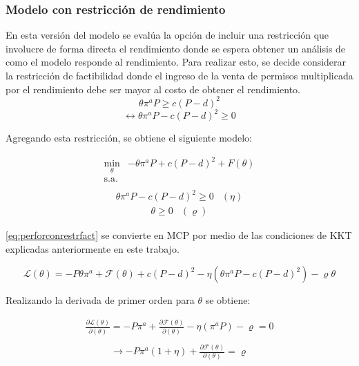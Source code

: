 \subsubsection{Modelo con restricción de rendimiento}\label{modelo:conrendimiento}

En esta versión del modelo se evalúa la opción de incluir una restricción que involucre de forma directa el rendimiento donde se espera obtener un análisis de como el modelo responde al rendimiento. Para realizar esto, se decide considerar la restricción de factibilidad donde el ingreso de la venta de permisos multiplicada por el rendimiento debe ser mayor al costo de obtener el rendimiento. 
$$\theta \pi^a P  \geq  c(P-d)^2 $$
$$\leftrightarrow \theta \pi^a P - c(P-d)^2 \geq 0 $$

Agregando esta restricción, se obtiene el siguiente modelo: 

\begin{equation}
\begin{array}{rrclcl}
   \displaystyle \min_{\theta} & -\theta \pi^aP + c(P-d)^2+F(\theta) \\\textrm{s.a.} \label{eq:perforconrestrfact}\\
\end{array}
\end{equation}
\begin{equation}
\begin{array}{cl}
    \theta \pi^a P - c(P-d)^2 \geq 0 & (\eta)  \label{perforconrestrfact:r1}
\end{array}
\end{equation}
\begin{equation}
\begin{array}{cl}
    \theta \geq 0 & (\varrho)
\end{array}
\end{equation}

\ref{eq:perforconrestrfact} se convierte en MCP por medio de las condiciones de KKT explicadas anteriormente en este trabajo. 

$$\mathcal{L}(\theta)=-P\theta\pi^a+\mathcal{F}(\theta)+c(P-d)^2 -\eta(\theta \pi^a P - c(P-d)^2)- \varrho\theta $$

Realizando la derivada de primer orden para $\theta$ se obtiene:

\begin{equation}
\begin{array}{rrclcl}
    \frac{\partial\mathcal{L}(\theta)}{\partial (\theta)}=-P\pi^a+\frac{\partial\mathcal{F}(\theta)}{\partial(\theta)}-\eta(\pi^a P) -\varrho=0 \label{lag30}\\
\end{array}
\end{equation}
\begin{equation}
\begin{array}{rrclcl}
    \rightarrow -P\pi^a(1+\eta)+\frac{\partial\mathcal{F}(\theta)}{\partial(\theta)}=\varrho \label{lag31}\\
\end{array}
\end{equation}

